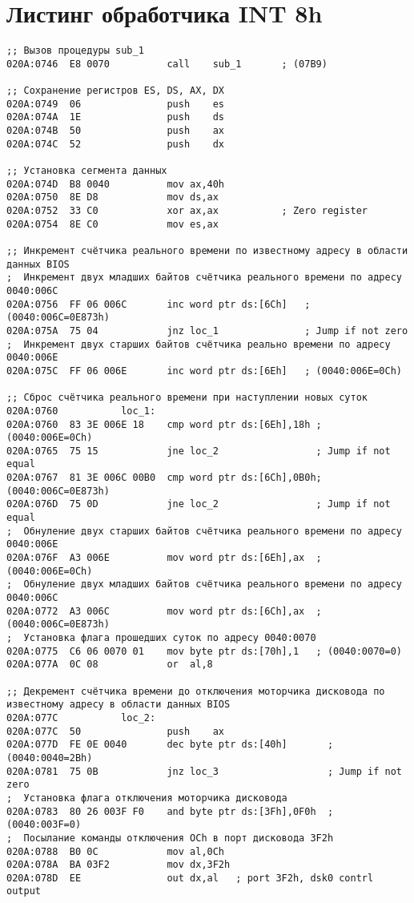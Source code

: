\documentclass[a4paper,14pt]{extreport}
\begin{document}


\section*{Листинг обработчика INT 8h}

\begin{lstlisting}[style={asm}]
;; Вызов процедуры sub_1
020A:0746  E8 0070			call	sub_1		; (07B9)

;; Сохранение регистров ES, DS, AX, DX
020A:0749  06				push	es
020A:074A  1E				push	ds
020A:074B  50				push	ax
020A:074C  52				push	dx

;; Установка сегмента данных
020A:074D  B8 0040			mov	ax,40h
020A:0750  8E D8			mov	ds,ax
020A:0752  33 C0			xor	ax,ax			; Zero register
020A:0754  8E C0			mov	es,ax

;; Инкремент счётчика реального времени по известному адресу в области данных BIOS
;  Инкремент двух младших байтов счётчика реального времени по адресу 0040:006C
020A:0756  FF 06 006C		inc	word ptr ds:[6Ch]	; (0040:006C=0E873h)
020A:075A  75 04			jnz	loc_1				; Jump if not zero
;  Инкремент двух старших байтов счётчика реально времени по адресу 0040:006E
020A:075C  FF 06 006E		inc	word ptr ds:[6Eh]	; (0040:006E=0Ch)

;; Сброс счётчика реального времени при наступлении новых суток
020A:0760			loc_1:
020A:0760  83 3E 006E 18	cmp	word ptr ds:[6Eh],18h ; (0040:006E=0Ch)
020A:0765  75 15			jne	loc_2				  ; Jump if not equal
020A:0767  81 3E 006C 00B0	cmp	word ptr ds:[6Ch],0B0h; (0040:006C=0E873h)
020A:076D  75 0D			jne	loc_2				  ; Jump if not equal
;  Обнуление двух старших байтов счётчика реального времени по адресу 0040:006E
020A:076F  A3 006E			mov	word ptr ds:[6Eh],ax  ; (0040:006E=0Ch)
;  Обнуление двух младших байтов счётчика реального времени по адресу 0040:006C
020A:0772  A3 006C			mov	word ptr ds:[6Ch],ax  ; (0040:006C=0E873h)
;  Установка флага прошедших суток по адресу 0040:0070
020A:0775  C6 06 0070 01	mov	byte ptr ds:[70h],1	  ; (0040:0070=0)
020A:077A  0C 08			or	al,8

;; Декремент счётчика времени до отключения моторчика дисковода по известному адресу в области данных BIOS
020A:077C			loc_2:
020A:077C  50				push	ax
020A:077D  FE 0E 0040		dec	byte ptr ds:[40h]		; (0040:0040=2Bh)
020A:0781  75 0B			jnz	loc_3					; Jump if not zero
;  Установка флага отключения моторчика дисковода
020A:0783  80 26 003F F0	and	byte ptr ds:[3Fh],0F0h	; (0040:003F=0)
;  Посылание команды отключения OCh в порт дисковода 3F2h
020A:0788  B0 0C			mov	al,0Ch
020A:078A  BA 03F2			mov	dx,3F2h
020A:078D  EE				out	dx,al	; port 3F2h, dsk0 contrl output


\end{lstlisting}
\end{document}
